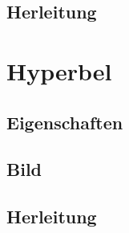 \documentclass[12pt, a4paper, draft]{report}
\begin{document}
	\section{Herleitung}

\chapter{Hyperbel}
	\setcounter{section}{0}
	\section{Eigenschaften}
	\section{Bild}
	\section{Herleitung}




\clearpage

\end{document}

